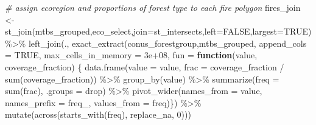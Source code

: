 \documentclass[
]{book}
\newenvironment{Shaded}{\begin{snugshade}}{\end{snugshade}}
\newcommand{\AttributeTok}[1]{\textcolor[rgb]{0.77,0.63,0.00}{#1}}
\newcommand{\CommentTok}[1]{\textcolor[rgb]{0.56,0.35,0.01}{\textit{#1}}}
\newcommand{\ConstantTok}[1]{\textcolor[rgb]{0.00,0.00,0.00}{#1}}
\newcommand{\ControlFlowTok}[1]{\textcolor[rgb]{0.13,0.29,0.53}{\textbf{#1}}}
\newcommand{\DecValTok}[1]{\textcolor[rgb]{0.00,0.00,0.81}{#1}}
\newcommand{\FloatTok}[1]{\textcolor[rgb]{0.00,0.00,0.81}{#1}}
\newcommand{\FunctionTok}[1]{\textcolor[rgb]{0.00,0.00,0.00}{#1}}
\newcommand{\NormalTok}[1]{#1}
\newcommand{\OtherTok}[1]{\textcolor[rgb]{0.56,0.35,0.01}{#1}}
\newcommand{\SpecialCharTok}[1]{\textcolor[rgb]{0.00,0.00,0.00}{#1}}
\newcommand{\StringTok}[1]{\textcolor[rgb]{0.31,0.60,0.02}{#1}}
\begin{document}
\begin{Shaded}
\begin{Highlighting}[]
\CommentTok{\# assign ecoregion and proportions of forest type to each fire polygon}
\NormalTok{fires\_join }\OtherTok{\textless{}{-}} \FunctionTok{st\_join}\NormalTok{(mtbs\_grouped,eco\_select,}\AttributeTok{join=}\NormalTok{st\_intersects,}\AttributeTok{left=}\ConstantTok{FALSE}\NormalTok{,}\AttributeTok{largest=}\ConstantTok{TRUE}\NormalTok{) }\SpecialCharTok{\%\textgreater{}\%} 
  \FunctionTok{left\_join}\NormalTok{(., }\FunctionTok{exact\_extract}\NormalTok{(conus\_forestgroup,mtbs\_grouped, }\AttributeTok{append\_cols =} \ConstantTok{TRUE}\NormalTok{, }\AttributeTok{max\_cells\_in\_memory =} \FloatTok{3e+08}\NormalTok{, }
                             \AttributeTok{fun =} \ControlFlowTok{function}\NormalTok{(value, coverage\_fraction) \{}
                               \FunctionTok{data.frame}\NormalTok{(}\AttributeTok{value =}\NormalTok{ value,}
                                          \AttributeTok{frac =}\NormalTok{ coverage\_fraction }\SpecialCharTok{/} \FunctionTok{sum}\NormalTok{(coverage\_fraction)) }\SpecialCharTok{\%\textgreater{}\%}
                                 \FunctionTok{group\_by}\NormalTok{(value) }\SpecialCharTok{\%\textgreater{}\%}
                                 \FunctionTok{summarize}\NormalTok{(}\AttributeTok{freq =} \FunctionTok{sum}\NormalTok{(frac), }\AttributeTok{.groups =} \StringTok{\textquotesingle{}drop\textquotesingle{}}\NormalTok{) }\SpecialCharTok{\%\textgreater{}\%}
                                 \FunctionTok{pivot\_wider}\NormalTok{(}\AttributeTok{names\_from =} \StringTok{\textquotesingle{}value\textquotesingle{}}\NormalTok{,}
                                             \AttributeTok{names\_prefix =} \StringTok{\textquotesingle{}freq\_\textquotesingle{}}\NormalTok{,}
                                             \AttributeTok{values\_from =} \StringTok{\textquotesingle{}freq\textquotesingle{}}\NormalTok{)\}) }\SpecialCharTok{\%\textgreater{}\%}
              \FunctionTok{mutate}\NormalTok{(}\FunctionTok{across}\NormalTok{(}\FunctionTok{starts\_with}\NormalTok{(}\StringTok{\textquotesingle{}freq\textquotesingle{}}\NormalTok{), replace\_na, }\DecValTok{0}\NormalTok{)))}
 

\end{Highlighting}
\end{Shaded}
\end{document}
